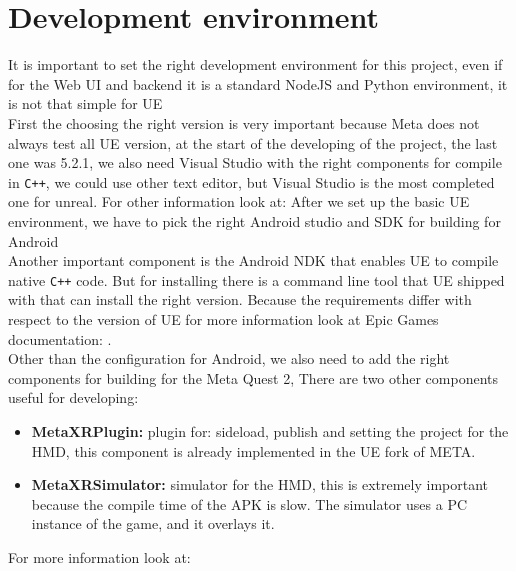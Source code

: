 \section{Development environment}
\noindent
It is important to set the right development environment for this project, even if for the Web \ac{UI} and backend it is a standard NodeJS and Python environment, 
it is not that simple for \ac{UE}\\
First the choosing the right version is very important because Meta does not always test all \ac{UE} version, at the start of the developing of the project, the last one was 5.2.1,
we also need Visual Studio with the right components for compile in \texttt{C++}, we could use other text editor, but Visual Studio is the most completed one for unreal.
For other information look at: \cite{UEvisualStudio}
After we set up the basic \ac{UE} environment, we have to pick the right Android studio and \ac{SDK} for building for Android \\
Another important component is the Android \ac{NDK} that enables \ac{UE} to compile native \texttt{C++} code.
But for installing there is a command line tool that \ac{UE} shipped with that can install the right version. 
Because the requirements differ with respect to the version of \ac{UE} for more information look at Epic Games documentation: \cite{UEandroid}.\\
Other than the configuration for Android, we also need to add the right components for building for the Meta Quest 2,
There are two other components useful for developing:
\begin{itemize}
  \item \textbf{MetaXRPlugin:} plugin for: sideload, publish and setting the project for the \ac{HMD}, this component is already implemented in the \ac{UE} fork of META.
  \item \textbf{MetaXRSimulator:} simulator for the \ac{HMD}, this is extremely important because the compile time of the \ac{APK} is slow. The simulator uses a PC instance of the game, and it overlays it.
\end{itemize}
\noindent
For more information look at: \cite{MetaSetup}

